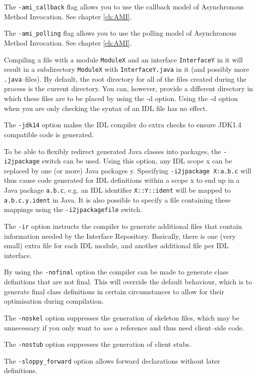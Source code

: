 The {\tt -ami\_callback} flag allows you to use the callback model of
Asynchronous Method Invocation. See chapter \ref{ch:AMI}.

The {\tt -ami\_polling} flag allows you to use the polling model of
Asynchronous Method Invocation. See chapter \ref{ch:AMI}.

Compiling a  file with  a module {\tt  ModuleX} and
an interface {\tt InterfaceY} in it  will result in a subdirectory
 {\tt ModuleX} with {\tt InterfaceY.java} in it (and possibly more
 {\tt .java}--files). By default, the root directory for all of the
 files created during  the process is the current directory. You can,
 however, provide a  different directory in which these  files are to
 be placed by  using the -d option. Using the -d  option when you are
 only checking the syntax of an IDL file has no effect.

The {\tt -jdk14} option makes the IDL compiler do extra checks to ensure
JDK1.4 compatible code is generated.

To be able to flexibly redirect generated Java classes into packages,
the {\tt -i2jpackage} switch can be used. Using this option, any IDL
scope x can be replaced by one (or more) Java packages y. Specifying
{\tt -i2jpackage X:a.b.c} will thus cause code generated for IDL
definitions within a scope x to end up in a Java package {\tt a.b.c},
e.g. an IDL identifier {\tt X::Y::ident} will be mapped to {\tt
  a.b.c.y.ident} in Java. It is also possible to specify a file
containing these mappings using the {\tt -i2jpackagefile} switch.

The  {\tt -ir} option  instructs the  compiler to  generate additional
files   that    contain   information   needed    by   the   Interface
Repository. Basically, there  is one (very small) extra  file for each
IDL module, and another additional file per IDL interface.

By using the {\tt -nofinal} option the compiler can be made to generate
class definitions that are not final. This will override the default
behaviour, which is to generate final class definitions in certain
circumstances to allow for their optimisation during compilation.

The {\tt -noskel} option suppresses the generation of skeleton files,
which may be unnecessary if you only want to {\em use} a reference and
thus need client--side code.

The {\tt -nostub} option suppresses the generation of client stubs.

The {\tt -sloppy\_forward} option allows forward declarations without
later definitions.

